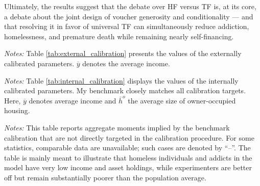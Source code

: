\documentclass[parskip=full]{article}
\theoremstyle{plain}
\theoremstyle{definition}
\theoremstyle{remark}
\newenvironment{fignote2}[1]
{
\par
\medskip
\begin{minipage}{#1}
\footnotesize
}
{
\end{minipage}
}
\begin{document}
Ultimately, the results suggest that the debate over HF 
versus TF is, at its core, a debate about the joint design of voucher generosity and conditionality — and that resolving it in favor of universal TF can simultaneously reduce addiction, homelessness, and premature death while remaining nearly self-financing.




\clearpage

\begin{table}[H]
    \centering
    \vspace{-0.5cm}
    
    \vspace{-0.65cm}
    \begin{fignote2}{1.02\textwidth}
    \textit{Notes:} Table \ref{tab:external_calibration} presents the values of the externally calibrated parameters. $\overline{y}$ denotes the average income.
    \end{fignote2}
\end{table}

\clearpage

\begin{table}[H]
    \centering
    \vspace{-0.5cm}
    
    \vspace{-0.45cm}
    \begin{fignote2}{0.97\textwidth}
    \textit{Notes:} Table \ref{tab:internal_calibration} displays the values of the internally calibrated parameters. My benchmark closely matches all calibration targets. Here, $\overline{y}$ denotes average income and $\bar h^{o}$ the average size of owner-occupied housing.
    \end{fignote2}
\end{table}

\begin{table}[H]
    \centering
    \vspace{-0.5cm}
     
    \vspace{-0.5cm}
    \begin{fignote2}{0.95\textwidth}
    \textit{Notes:} 
    This table reports aggregate moments implied by the benchmark calibration that are not directly targeted in the calibration procedure. For some statistics, comparable data are unavailable; such cases are denoted by ``--''. The table is mainly meant to illustrate that homeless individuals and addicts in the model have very low income and asset holdings, while experimenters are better off but remain substantially poorer than the population average.
    \end{fignote2}
\end{table}
\end{document}
